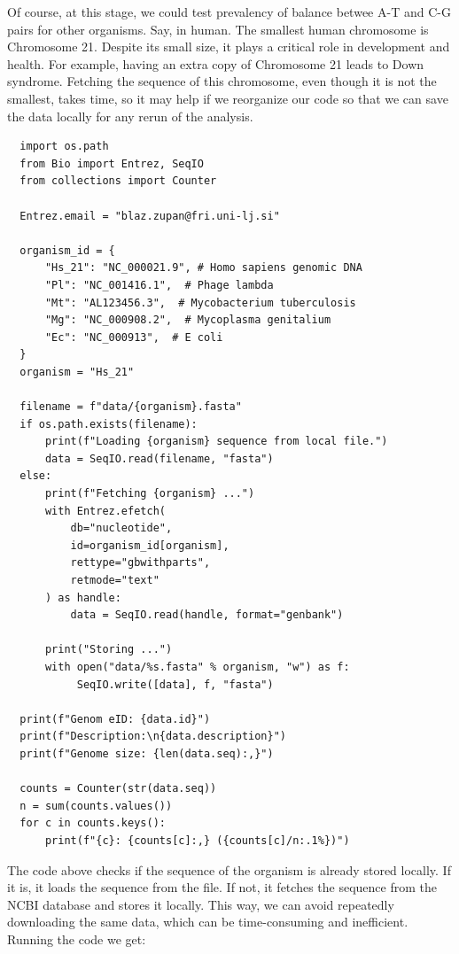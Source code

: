 Of course, at this stage, we could test prevalency of balance betwee A-T and C-G pairs for other organisms. Say, in human. The smallest human chromosome is Chromosome 21. Despite its small size, it plays a critical role in development and health. For example, having an extra copy of Chromosome 21 leads to Down syndrome. Fetching the sequence of this chromosome, even though it is not the smallest, takes time, so it may help if we reorganize our code so that we can save the data locally for any rerun of the analysis.

\vspace*{3mm}
\begin{lstlisting}
  import os.path
  from Bio import Entrez, SeqIO
  from collections import Counter
  
  Entrez.email = "blaz.zupan@fri.uni-lj.si"
  
  organism_id = {
      "Hs_21": "NC_000021.9", # Homo sapiens genomic DNA
      "Pl": "NC_001416.1",  # Phage lambda
      "Mt": "AL123456.3",  # Mycobacterium tuberculosis
      "Mg": "NC_000908.2",  # Mycoplasma genitalium
      "Ec": "NC_000913",  # E coli
  }
  organism = "Hs_21"
  
  filename = f"data/{organism}.fasta"
  if os.path.exists(filename):
      print(f"Loading {organism} sequence from local file.")
      data = SeqIO.read(filename, "fasta")
  else:
      print(f"Fetching {organism} ...")
      with Entrez.efetch(
          db="nucleotide",
          id=organism_id[organism],
          rettype="gbwithparts",
          retmode="text"
      ) as handle:
          data = SeqIO.read(handle, format="genbank")
  
      print("Storing ...")
      with open("data/%s.fasta" % organism, "w") as f:
           SeqIO.write([data], f, "fasta")
  
  print(f"Genom eID: {data.id}")
  print(f"Description:\n{data.description}")
  print(f"Genome size: {len(data.seq):,}")
  
  counts = Counter(str(data.seq))
  n = sum(counts.values())
  for c in counts.keys():
      print(f"{c}: {counts[c]:,} ({counts[c]/n:.1%})")
\end{lstlisting}

The code above checks if the sequence of the organism is already stored locally. If it is, it loads the sequence from the file. If not, it fetches the sequence from the NCBI database and stores it locally. This way, we can avoid repeatedly downloading the same data, which can be time-consuming and inefficient. Running the code we get:

